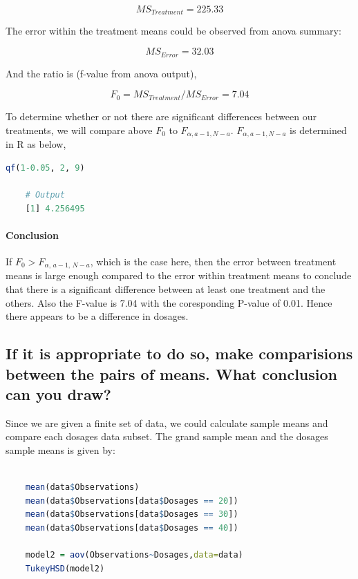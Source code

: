 \documentclass[11pt]{article}
\begin{document}
$$\displaystyle MS_{Treatment} = 225.33$$

The error within the treatment means could be observed from anova summary: 

$$\displaystyle MS_{Error} = 32.03$$

And the ratio is (f-value from anova output),

$$\displaystyle F_0 = MS_{Treatment}/MS_{Error} = 7.04$$

To determine whether or not there are significant differences between our treatments, we will compare above $\displaystyle F_0$ to $\displaystyle F_{\alpha, a-1, N-a}$. $\displaystyle F_{\alpha, a-1, N-a}$ is determined in R as below,

\begin{lstlisting}[language=R]
    qf(1-0.05, 2, 9)   

    # Output
    [1] 4.256495
\end{lstlisting}

\paragraph{Conclusion}
If $\displaystyle F_{0}>F_{\alpha ,\,a-1,\,N-a}$, which is the case here, then the error between treatment means is large enough compared to the error within treatment means to conclude that there is a significant difference between at least one treatment and the others. Also the F-value is 7.04 with the coresponding P-value of 0.01. Hence there appears to be a difference in dosages.

\subsection{If it is appropriate to do so, make comparisions between the pairs of means. What conclusion can you draw?}

Since we are given a finite set of data, we could calculate sample means and compare each dosages data subset. The grand sample mean and the dosages sample means is given by: 

\begin{lstlisting}[language=R]
    
    mean(data$Observations)
    mean(data$Observations[data$Dosages == 20])
    mean(data$Observations[data$Dosages == 30])
    mean(data$Observations[data$Dosages == 40])

    model2 = aov(Observations~Dosages,data=data)
    TukeyHSD(model2)
\end{lstlisting}
\end{document}
